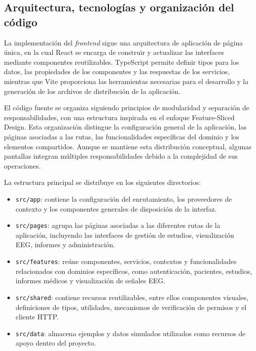 \subsection{Arquitectura, tecnologías y organización del código}

La implementación del \textit{frontend} sigue una arquitectura
de aplicación de página única, en la cual React se
encarga de construir y actualizar las interfaces
mediante componentes reutilizables. TypeScript
permite definir tipos para los datos, las propiedades
de los componentes y las respuestas de los servicios,
mientras que Vite proporciona las herramientas
necesarias para el desarrollo y la generación de
los archivos de distribución de la aplicación.

El código fuente se organiza siguiendo principios
de modularidad y separación de responsabilidades,
con una estructura inspirada en el enfoque
Feature-Sliced Design. Esta organización distingue
la configuración general de la aplicación, las
páginas asociadas a las rutas, las funcionalidades
específicas del dominio y los elementos compartidos.
Aunque se mantiene esta distribución conceptual,
algunas pantallas integran múltiples responsabilidades
debido a la complejidad de sus operaciones.

La estructura principal se distribuye en los
siguientes directorios:

\begin{itemize}
    \item \texttt{src/app}: contiene la configuración
    del enrutamiento, los proveedores de contexto y
    los componentes generales de disposición de la
    interfaz.

    \item \texttt{src/pages}: agrupa las páginas
    asociadas a las diferentes rutas de la aplicación,
    incluyendo las interfaces de gestión de estudios,
    visualización EEG, informes y administración.

    \item \texttt{src/features}: reúne componentes,
    servicios, contextos y funcionalidades
    relacionados con dominios específicos, como
    autenticación, pacientes, estudios, informes
    médicos y visualización de señales EEG.

    \item \texttt{src/shared}: contiene recursos
    reutilizables, entre ellos componentes visuales,
    definiciones de tipos, utilidades, mecanismos
    de verificación de permisos y el cliente HTTP.

    \item \texttt{src/data}: almacena ejemplos y
    datos simulados utilizados como recursos de
    apoyo dentro del proyecto.
\end{itemize}

